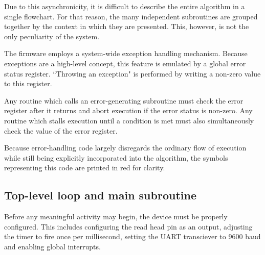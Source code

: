 \documentclass{article}
\begin{document}
	Due to this asynchronicity, it is difficult to describe the entire
	algorithm in a single flowchart. For that reason, the many independent
	subroutines are grouped together by the context in which they are
	presented. This, however, is not the only peculiarity of the system.
	
	The firmware employs a system-wide exception handling mechanism. Because
	exceptions are a high-level concept, this feature is emulated by a global
	error status register. ``Throwing an exception" is performed by writing a
	non-zero value to this register.
	
	Any routine which calls an error-generating subroutine must check the error
	register after it returns and abort execution if the error status is
	non-zero. Any routine which stalls execution until a condition is met must
	also simultaneously check the value of the error register.
	
	Because error-handling code largely disregards the ordinary flow of
	execution while still being explicitly incorporated into the algorithm, the
	symbols representing this code are printed in red for clarity.
	
	\subsection{Top-level loop and main subroutine}
	
	Before any meaningful activity may begin, the device must be properly
	configured. This includes configuring the read head pin as an output,
	adjusting the timer to fire once per millisecond, setting the UART
	transciever to 9600 baud and enabling global interrupts.
	
\end{document}
